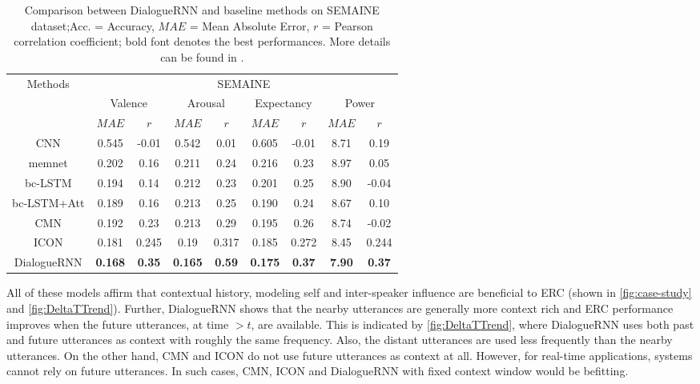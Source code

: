 \documentclass{IEEEtran}\usepackage[pdftex]{graphicx}
\begin{document}
	\begin{table*}[t]
		\centering
\begin{tabular}{c||c@{~~}c|c@{~~}c|c@{~~}c|c@{~~}c}
			\hline
			\multirow{3}{*}{Methods} & \multicolumn{8}{c}{SEMAINE}\\
			\cline{2-9} &\multicolumn{2}{c|}{Valence}& \multicolumn{2}{c|}{Arousal}& \multicolumn{2}{c|}{Expectancy} & \multicolumn{2}{c}{Power}\\
			\cline{2-9} & $MAE$ & $r$ & $MAE$ & $r$ & $MAE$ & $r$ & $MAE$ & $r$\\
			\hline
			\hline
			CNN &0.545&-0.01&0.542&0.01&0.605&-0.01&8.71&0.19 \\
			memnet &0.202&0.16&0.211&0.24&0.216&0.23&8.97&0.05\\
			bc-LSTM &0.194&0.14&0.212&0.23&0.201&0.25&8.90&-0.04 \\
			bc-LSTM+Att &0.189&0.16&0.213&0.25&0.190&0.24&8.67&0.10 \\
			\hline
			CMN &0.192&0.23&0.213&0.29&0.195&0.26&8.74&-0.02 \\
			ICON&0.181&0.245&0.19&0.317&0.185&0.272&8.45&0.244\\
			\hline
			DialogueRNN &{\bf 0.168}&{\bf 0.35}&{\bf 0.165}&{\bf 0.59}&{\bf 0.175}&{\bf 0.37}&{\bf 7.90}&{\bf 0.37}\\
			\hline
		\end{tabular}
		\caption{Comparison between DialogueRNN and baseline methods on SEMAINE dataset;Acc. = Accuracy,
			$MAE$ = Mean Absolute Error, $r$ = Pearson correlation coefficient; bold font denotes
			the best performances. More details can be found in \citet{majumder2019dialoguernn}.}
		\label{tab:results-text2}
	\end{table*}
	
	All of these models affirm that contextual history, modeling self and inter-speaker influence are beneficial to ERC (shown in \cref{fig:case-study} and \cref{fig:DeltaTTrend}). Further, DialogueRNN shows that the nearby utterances are generally more context rich and ERC performance improves when the future utterances, at time $>t$, are available. This is indicated by \cref{fig:DeltaTTrend}, where DialogueRNN uses both past and future utterances as context with roughly the same frequency. Also, the distant utterances are used less frequently than the nearby utterances. On the other hand, CMN and ICON do not use future utterances as context at all. However, for real-time applications, systems cannot rely on future utterances. In such cases, CMN, ICON and DialogueRNN with fixed context window would be befitting.
	
\end{document}
